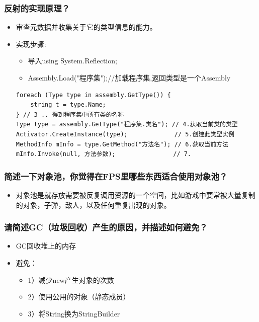 \documentclass[9pt, b5paper]{article}
\begin{document}
\subsubsection{反射的实现原理？}
\label{sec:orga801864}
\begin{itemize}
\item 审查元数据并收集关于它的类型信息的能力。
\item 实现步骤:
\begin{itemize}
\item 导入using System.Reflection;
\item Assembly.Load("程序集");//加载程序集,返回类型是一个Assembly
\end{itemize}
\begin{verbatim}
foreach (Type type in assembly.GetType()) {
    string t = type.Name;
} // 3 .. 得到程序集中所有类的名称
Type type = assembly.GetType("程序集.类名"); // 4.获取当前类的类型
Activator.CreateInstance(type);             // 5.创建此类型实例
MethodInfo mInfo = type.GetMethod("方法名"); // 6.获取当前方法
mInfo.Invoke(null, 方法参数);                // 7.
\end{verbatim}
\end{itemize}

\subsubsection{简述一下对象池，你觉得在FPS里哪些东西适合使用对象池？}
\label{sec:org62fedb9}
\begin{itemize}
\item 对象池是就存放需要被反复调用资源的一个空间，比如游戏中要常被大量复制的对象，子弹，敌人，以及任何重复出现的对象。
\end{itemize}

\subsubsection{请简述GC（垃圾回收）产生的原因，并描述如何避免？}
\label{sec:orgda64b14}
\begin{itemize}
\item GC回收堆上的内存
\item 避免：
\begin{itemize}
\item 1）减少new产生对象的次数
\item 2）使用公用的对象（静态成员）
\item 3）将String换为StringBuilder
\end{itemize}
\end{itemize}
\end{document}
